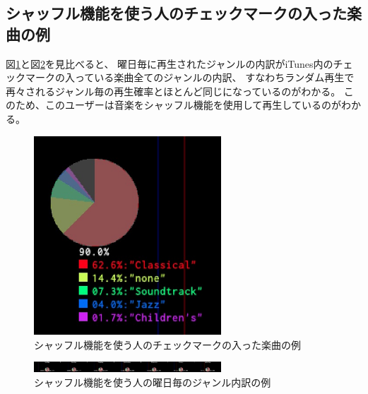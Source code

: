 \documentclass[11pt, twocolumn]{jsarticle}
\begin{document}
\subsection{シャッフル機能を使う人のチェックマークの入った楽曲の例}
図\ref{checkedItemsGenreMap_shuffle}と図\ref{weekGenreMap_shuffle}を見比べると、
曜日毎に再生されたジャンルの内訳がiTunes内のチェックマークの入っている楽曲全てのジャンルの内訳、
すなわちランダム再生で再々されるジャンル毎の再生確率とほとんど同じになっているのがわかる。
このため、このユーザーは音楽をシャッフル機能を使用して再生しているのがわかる。

\begin{figure}[h]
\begin{center}
\includegraphics[width=7cm]{taru_checkedItemGenreRatio.jpg}
\caption{シャッフル機能を使う人のチェックマークの入った楽曲の例}
\label{checkedItemsGenreMap_shuffle}
\end{center}
\end{figure}

\begin{figure}[h]
\begin{center}
\includegraphics[width=7cm]{taru_weekGenreRatio.jpg}
\caption{シャッフル機能を使う人の曜日毎のジャンル内訳の例}
\label{weekGenreMap_shuffle}
\end{center}
\end{figure}
\end{document}
